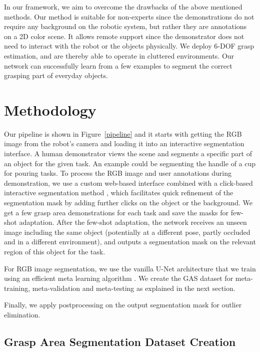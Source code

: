 \documentclass[letterpaper]{article} %
\begin{document}
In our framework, we aim to overcome the drawbacks of the above mentioned methods. Our method is suitable for non-experts since the demonstrations do not require any background on the robotic system, but rather they are annotations on a 2D color scene. It allows remote support since the demonstrator does not need to interact with the robot or the objects physically. We deploy 6-DOF grasp estimation, and are thereby able to operate in cluttered environments. Our network can successfully learn from a few examples to segment the correct grasping part of everyday objects.


\section{Methodology}
\label{sec:methodology}

Our pipeline is shown in Figure~\ref{pipeline} and it starts with getting the RGB image from the robot's camera and loading it into an interactive segmentation interface. A human demonstrator views the scene and segments a specific part of an object for the given task. An example could be segmenting the handle of a cup for pouring tasks. To process the RGB image and user annotations during demonstration, we use a custom web-based interface combined with a click-based interactive segmentation method \cite{sofiiuk2020f}, which facilitates quick refinement of the segmentation mask by adding further clicks on the object or the background. We get a few grasp area demonstrations for each task and save the masks for few-shot adaptation. After the few-shot adaptation, the network receives an unseen image including the same object (potentially at a different pose, partly occluded and in a different environment), and outputs a segmentation mask on the relevant region of this object for the task.

For RGB image segmentation, we use the vanilla U-Net architecture \cite{ronneberger2015u} that we train using an efficient meta learning algorithm \cite{nichol2018reptile}. We create the GAS dataset for meta-training, meta-validation and meta-testing as explained in the next section.

Finally, we apply postprocessing on the output segmentation mask for outlier elimination.

\subsection{Grasp Area Segmentation Dataset Creation}
\label{dataset_section}
\end{document}
